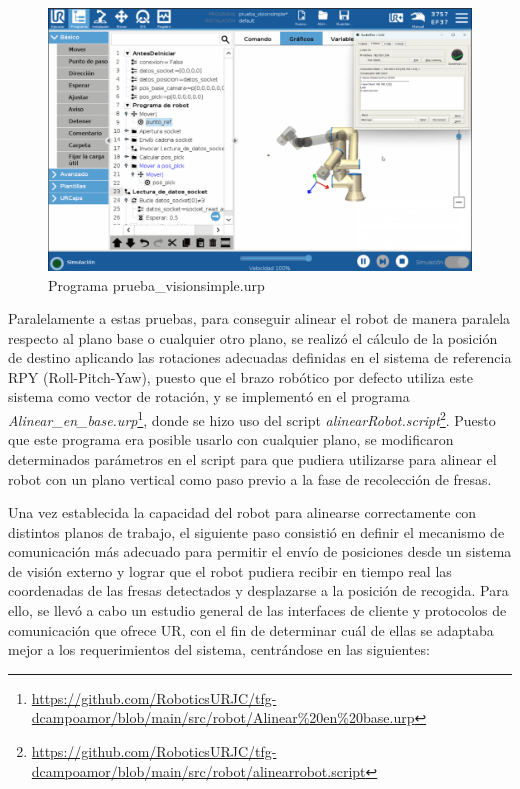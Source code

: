   \begin{figure}[H]
     \centering
     \begin{center}
       \includegraphics[width=155mm]{figs/prueba_visionsimple.png}
     \end{center}
     \caption{Programa prueba\_visionsimple.urp}
     \label{fig:prueba_visionsimple}
  \end{figure}
  
Paralelamente a estas pruebas, para conseguir alinear el robot de manera paralela respecto al plano base o cualquier otro plano, se realizó el cálculo de la posición de destino aplicando las rotaciones adecuadas definidas en el sistema de referencia RPY (Roll-Pitch-Yaw), puesto que el brazo robótico por defecto utiliza este sistema como vector de rotación, y se implementó en el programa \textit{Alinear\_en\_base.urp}\footnote{\url{https://github.com/RoboticsURJC/tfg-dcampoamor/blob/main/src/robot/Alinear\%20en\%20base.urp}}, donde se hizo uso del script \textit{alinearRobot.script}\footnote{\url{https://github.com/RoboticsURJC/tfg-dcampoamor/blob/main/src/robot/alinearrobot.script}}. Puesto que este programa era posible usarlo con cualquier plano, se modificaron determinados parámetros en el script para que pudiera utilizarse para alinear el robot con un plano vertical como paso previo a la fase de recolección de fresas.

Una vez establecida la capacidad del robot para alinearse correctamente con distintos planos de trabajo, el siguiente paso consistió en definir el mecanismo de comunicación más adecuado para permitir el envío de posiciones desde un sistema de visión externo y lograr que el robot pudiera recibir en tiempo real las coordenadas de las fresas detectados y desplazarse a la posición de recogida. Para ello, se llevó a cabo un estudio general de las interfaces de cliente y protocolos de comunicación que ofrece UR, con el fin de determinar cuál de ellas se adaptaba mejor a los requerimientos del sistema, centrándose en las siguientes:

